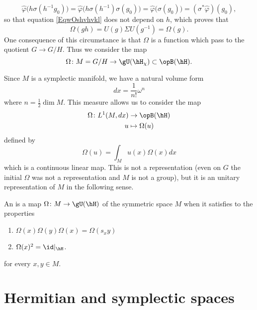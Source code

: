 \begin{equation}
	\hat\varphi\big( h\sigma(h^{-1}g_0) \big)=\hat\varphi\big( h\sigma(h^{-1})\sigma(g_0) \big)=\hat\varphi\big( \sigma(g_0) \big)=(\sigma^*\hat\varphi)(g_0),
\end{equation}
so that equation \eqref{EqwOshvhvkl} does not depend on $h$, which proves that
\begin{equation}
	\Omega(gh)=U(g)\Sigma U(g^{-1})=\Omega(g).
\end{equation}
One consequence of this circumstance is that $\Omega$ is a function which pass to the quotient $G\to G/H$. Thus we consider the map
\begin{equation}
	\Omega\colon M=G/H\to \gU(\hH_{\chi})\subset\opB(\hH).
\end{equation}

Since $M$ is a symplectic manifold, we have a natural volume form
\begin{equation}
	dx=\frac{1}{ n! }\omega^n
\end{equation}
where $n=\frac{ 1 }{2}\dim M$. This measure allows us to consider the map
\begin{equation}
	\begin{aligned}
		\Omega\colon L^1(M,dx)&\to \opB(\hH) \\
		u&\mapsto \Omega(u) 
	\end{aligned}
\end{equation}
defined by
\begin{equation}
	\Omega(u)=\int_M u(x)\Omega(x)dx
\end{equation}
which is a continuous linear map. This is not a representation (even on $G$ the initial $\Omega$ was not a representation and $M$ is not a group), but it is an unitary representation of $M$ in the following sense.

\begin{definition}
	An  is a map $\Omega\colon M\to \gU(\hH)$ of the symmetric space $M$ when it satisfies to the properties
	\begin{enumerate}	
		\item
			$\Omega(x)\Omega(y)\Omega(x)=\Omega(s_xy)$
		\item
			$\Omega(x)^2=\id|_{\hH}$.
	
	\end{enumerate}
	for every $x,y\in M$.
\end{definition}
\section{Hermitian and symplectic spaces}
\label{SecHermEtSymplecticSpaces}

